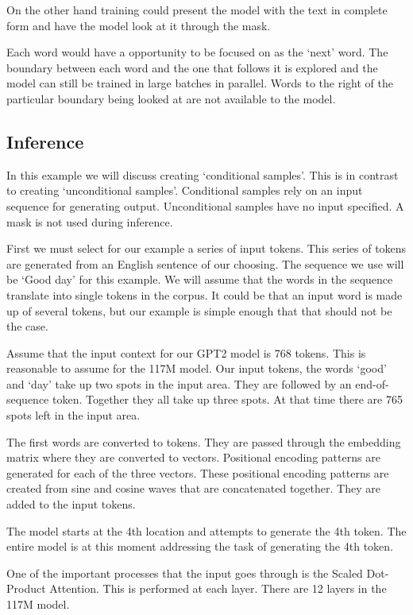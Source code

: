 On the other hand training could present the model with the text in complete form and have the model look at it through the mask. 

Each word would have a opportunity to be focused on as the `next' word. The boundary between each word and the one that follows it is explored and the model can still be trained in large batches in parallel. Words to the right of the particular boundary being looked at are not available to the model.


\subsection{Inference}

In this example we will discuss creating `conditional samples'. This is in contrast to creating `unconditional samples'. Conditional samples rely on an input sequence for generating output. Unconditional samples have no input specified. A mask is not used during inference.

First we must select for our example a series of input tokens. This series of tokens are generated from an English sentence of our choosing. The sequence we use will be `Good day' for this example. We will assume that the words in the sequence translate into single tokens in the corpus. It could be that an input word is made up of several tokens, but our example is simple enough that that should not be the case.

Assume that the input context for our GPT2 model is 768 tokens. This is reasonable to assume for the 117M model. Our input tokens, the words `good' and `day' take up two spots in the input area. They are followed by an end-of-sequence token. Together they all take up three spots. At that time there are 765 spots left in the input area.

The first words are converted to tokens. They are passed through the embedding matrix where they are converted to vectors. Positional encoding patterns are generated for each of the three vectors. These positional encoding patterns are created from sine and cosine waves that are concatenated together. They are added to the input tokens.

The model starts at the 4th location and attempts to generate the 4th token. The entire model is at this moment addressing the task of generating the 4th token.

One of the important processes that the input goes through is the Scaled Dot-Product Attention. This is performed at each layer. There are 12 layers in the 117M model.

